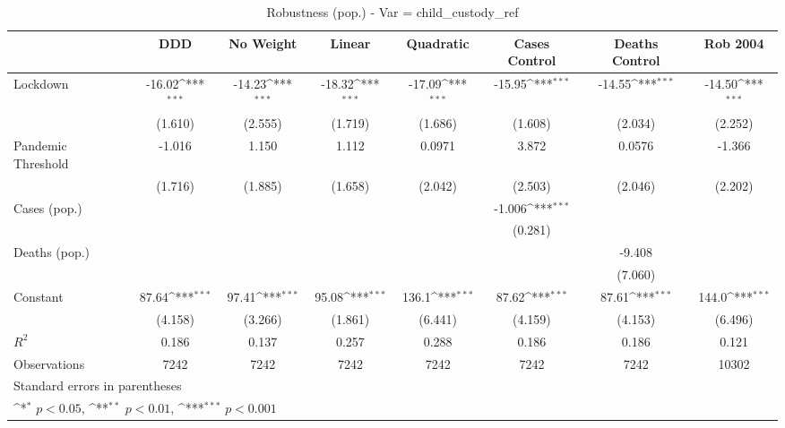 \documentclass{article}
\begin{document}
{
\def\sym#1{\ifmmode^{#1}\else\(^{#1}\)\fi}
\begin{longtable}{l*{7}{c}}
\caption{Robustness (pop.) - Var = child\_custody\_ref}\\
\hline\hline\endfirsthead\hline\endhead\hline\endfoot\endlastfoot
                &\multicolumn{1}{c}{DDD}&\multicolumn{1}{c}{No Weight}&\multicolumn{1}{c}{Linear}&\multicolumn{1}{c}{Quadratic}&\multicolumn{1}{c}{Cases Control}&\multicolumn{1}{c}{Deaths Control}&\multicolumn{1}{c}{Rob 2004}\\
\hline
Lockdown        &   -16.02\sym{***}&   -14.23\sym{***}&   -18.32\sym{***}&   -17.09\sym{***}&   -15.95\sym{***}&   -14.55\sym{***}&   -14.50\sym{***}\\
                &  (1.610)         &  (2.555)         &  (1.719)         &  (1.686)         &  (1.608)         &  (2.034)         &  (2.252)         \\
Pandemic Threshold&   -1.016         &    1.150         &    1.112         &   0.0971         &    3.872         &   0.0576         &   -1.366         \\
                &  (1.716)         &  (1.885)         &  (1.658)         &  (2.042)         &  (2.503)         &  (2.046)         &  (2.202)         \\
Cases (pop.)    &                  &                  &                  &                  &   -1.006\sym{***}&                  &                  \\
                &                  &                  &                  &                  &  (0.281)         &                  &                  \\
Deaths (pop.)   &                  &                  &                  &                  &                  &   -9.408         &                  \\
                &                  &                  &                  &                  &                  &  (7.060)         &                  \\
Constant        &    87.64\sym{***}&    97.41\sym{***}&    95.08\sym{***}&    136.1\sym{***}&    87.62\sym{***}&    87.61\sym{***}&    144.0\sym{***}\\
                &  (4.158)         &  (3.266)         &  (1.861)         &  (6.441)         &  (4.159)         &  (4.153)         &  (6.496)         \\
\hline
\(R^{2}\)       &    0.186         &    0.137         &    0.257         &    0.288         &    0.186         &    0.186         &    0.121         \\
Observations    &     7242         &     7242         &     7242         &     7242         &     7242         &     7242         &    10302         \\
\hline\hline
\multicolumn{8}{l}{\footnotesize Standard errors in parentheses}\\
\multicolumn{8}{l}{\footnotesize \sym{*} \(p<0.05\), \sym{**} \(p<0.01\), \sym{***} \(p<0.001\)}\\
\end{longtable}
}
\end{document}
